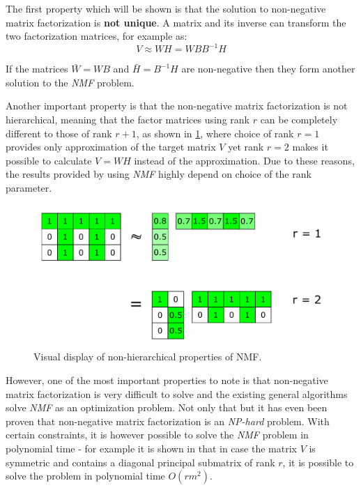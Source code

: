 \documentclass[thesis=M,english]{FITthesis}[2012/10/20]
\begin{document}
The first property which will be shown is that the solution to non-negative matrix
factorization is \textbf{not unique}. A matrix and its inverse can transform the two
factorization matrices, for example as:
\begin{equation}
  V \approx WH = WBB^{-1}H
\end{equation}

If the matrices $\bar{W} = WB$ and $\bar{H} = B^{-1}H$ are non-negative then they
form another solution to the \emph{NMF} problem.\cite{nmf-nonuniq}

Another important property is that the non-negative matrix factorization is not
hierarchical, meaning that the factor matrices using rank $r$ can be completely
different to those of rank $r+1$, as shown in \ref{fig:nmf-hierarchy}, where choice of
rank $r = 1$ provides only approximation of the target matrix $V$ yet rank $r = 2$ makes it
possible to calculate $V = WH$ instead of the approximation. Due to these
reasons, the results provided by using \emph{NMF} highly depend on choice of the rank
parameter.

\begin{figure}[h]
  \centering
  \caption{Visual display of non-hierarchical properties of NMF. \cite{nonhierarchy}}
  \label{fig:nmf-hierarchy}
  \includegraphics[scale=0.7]{non-hierarchical}
\end{figure}

However, one of the most important properties to note is that non-negative matrix
factorization is very difficult to solve and the existing general algorithms
solve \emph{NMF} as an optimization problem. Not only that but it has even been
proven that non-negative matrix factorization is an \emph{NP-hard} problem.\cite{nmf-nphard}
With certain constraints, it is however possible to solve the \emph{NMF} problem
in polynomial time - for example it is shown in \cite{nmf-poly} that in case the
matrix $V$ is symmetric and contains a diagonal principal submatrix of rank $r$,
it is possible to solve the problem in polynomial time $O(rm^{2})$.
\end{document}
